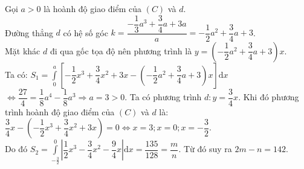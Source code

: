 \begin{ex}
{\begin{center}
		\end{center}
		Gọi $a>0$ là hoành độ giao điểm của $(C)$ và $d$.\\
		Đường thẳng $d$ có hệ số góc $k =\dfrac{-\dfrac{1}{3}a^3 + \dfrac{3}{4}a + 3a}{a} = -\dfrac{1}{2}a^2+\dfrac{3}{4}a + 3$.\\
		Mặt khác $d$ đi qua gốc tọa độ nên phương trình là $y = \left(-\dfrac{1}{2}a^2+\dfrac{3}{4}a + 3\right)x$.\\
		Ta có: $S_1 = \int\limits_{0}^{a} \left[-\dfrac{1}{2}x^3 +\dfrac{3}{4}x^2 + 3x - \left(-\dfrac{1}{2}a^2 + \dfrac{3}{4}a + 3\right)x\right] \mathrm{d} x$
		$\Leftrightarrow \dfrac{27}{4} = \dfrac{1}{8}a^4-\dfrac{1}{8}a^3 \Rightarrow a=3 > 0$.
		Ta có phương trình $d: y = \dfrac{3}{4}x$.
		Khi đó phương trình hoành độ giao điểm của $(C)$ và $d$ là:
		$\dfrac{3}{4}x - \left(-\dfrac{1}{2}x^3 + \dfrac{3}{4}x^2 + 3x\right) = 0 \Leftrightarrow x= 3 ; x = 0 ; x = -\dfrac{3}{2}$.\\
		Do đó $S_2 = \int\limits_{-\frac{3}{2}}^{0} \left|\dfrac{1}{2}x^3 - \dfrac{3}{4}x^2 - \dfrac{9}{4}x\right| \mathrm{d} x = \dfrac{135}{128} = \dfrac{m}{n}$. Từ đó suy ra $2m-n=142$.
	}
\end{ex}
